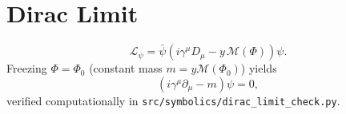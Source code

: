 
\section*{Dirac Limit}
\[
\mathcal{L}_\psi=\bar\psi\!\left(i\gamma^\mu D_\mu-y\,\mathcal M(\Phi)\right)\!\psi.
\]
Freezing $\Phi=\Phi_0$ (constant mass $m=y\mathcal M(\Phi_0)$) yields
\[
(i\gamma^\mu\partial_\mu-m)\psi=0,
\]
verified computationally in \texttt{src/symbolics/dirac\_limit\_check.py}.
